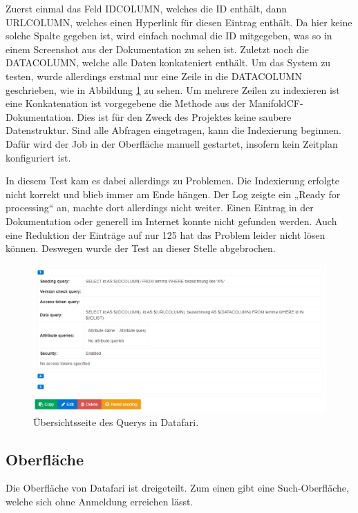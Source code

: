 Zuerst einmal das Feld IDCOLUMN, welches die ID enthält, dann URLCOLUMN, welches einen Hyperlink für diesen Eintrag enthält. Da hier keine solche Spalte gegeben ist, wird einfach nochmal die ID mitgegeben, was so in einem Screenshot aus der Dokumentation zu sehen ist. Zuletzt noch die DATACOLUMN, welche alle Daten konkateniert enthält. Um das System zu testen, wurde allerdings erstmal nur eine Zeile in die DATACOLUMN geschrieben, wie in Abbildung \ref{img:datafariQuery} zu sehen. Um mehrere Zeilen zu indexieren ist eine Konkatenation ist vorgegebene die Methode aus der ManifoldCF-Dokumentation. \cite[S.~97]{ApacheSoftwareFoundation.} Dies ist für den Zweck des Projektes keine saubere Datenstruktur.
Sind alle Abfragen eingetragen, kann die Indexierung beginnen. Dafür wird der Job in der Oberfläche manuell gestartet, insofern kein Zeitplan konfiguriert ist. \cite{datafari.25.2.2020}

In diesem Test kam es dabei allerdings zu Problemen. Die Indexierung erfolgte nicht korrekt und blieb immer am Ende hängen. Der Log zeigte ein „Ready for processing“ an, machte dort allerdings nicht weiter. Einen Eintrag in der Dokumentation oder generell im Internet konnte nicht gefunden werden. Auch eine Reduktion der Einträge auf nur 125 hat das Problem leider nicht lösen können. Deswegen wurde der Test an dieser Stelle abgebrochen. 

\begin{figure}
	\centering
	\includegraphics[width=1\linewidth]{images/datafari_query.png}
	\caption{Übersichtsseite des Querys in Datafari.}
	\label{img:datafariQuery}
\end{figure}

\subsection{Oberfläche}

Die Oberfläche von Datafari ist dreigeteilt. Zum einen gibt eine Such-Oberfläche, welche sich ohne Anmeldung erreichen lässt. 

